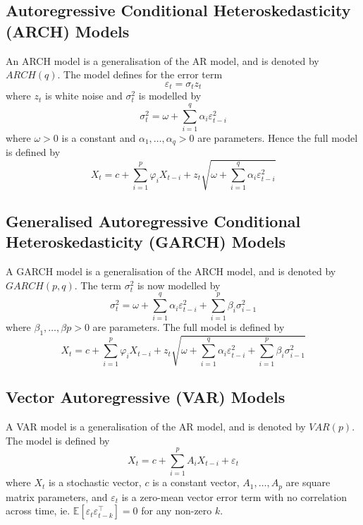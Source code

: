 \documentclass[11pt]{report} %
\begin{document}
\subsection{Autoregressive Conditional Heteroskedasticity (ARCH) Models}
An ARCH model is a generalisation of the AR model, and is denoted by $ARCH\left(q\right)$. The model defines for the error term
\begin{equation}
\varepsilon_{t} = \sigma_{t}z_{t}
\end{equation}
where $z_{t}$ is white noise and $\sigma^{2}_{t}$ is modelled by
\begin{equation}
\sigma^{2}_{t} = \omega + \sum_{i = 1}^{q}\alpha_{i}\varepsilon^{2}_{t - i}
\end{equation}
where $\omega > 0$ is a constant and $\alpha_{1}, \dots, \alpha_{q} > 0$ are parameters. Hence the full model is defined by
\begin{equation}
X_{t} = c + \sum_{i = 1}^{p}\varphi_{i}X_{t - i} + z_{t}\sqrt{\omega + \sum_{i = 1}^{q}\alpha_{i}\varepsilon^{2}_{t - i}}
\end{equation}

\subsection{Generalised Autoregressive Conditional Heteroskedasticity (GARCH) Models}
A GARCH model is a generalisation of the ARCH model, and is denoted by $GARCH\left(p, q\right)$. The term $\sigma^{2}_{t}$ is now modelled by
\begin{equation}
\sigma^{2}_{t} = \omega + \sum_{i = 1}^{q}\alpha_{i}\varepsilon^{2}_{t - i} + \sum_{i = 1}^{p}\beta_{i}\sigma^{2}_{i - 1}
\end{equation}
where $\beta_{1}, \dots, \beta{p} > 0$ are parameters. The full model is defined by
\begin{equation}
X_{t} = c + \sum_{i = 1}^{p}\varphi_{i}X_{t - i} + z_{t}\sqrt{\omega + \sum_{i = 1}^{q}\alpha_{i}\varepsilon^{2}_{t - i} + \sum_{i = 1}^{p}\beta_{i}\sigma^{2}_{i - 1}}
\end{equation}

\subsection{Vector Autoregressive (VAR) Models}
A VAR model is a generalisation of the AR model, and is denoted by  $VAR\left(p\right)$. The model is defined by
\begin{equation}
X_{t} = c + \sum_{i = 1}^{p}A_{i}X_{t - i} + \varepsilon_{t}
\end{equation}
where $X_{t}$ is a stochastic vector, $c$ is a constant vector, $A_{1}, \dots, A_{p}$ are square matrix parameters, and $\varepsilon_{t}$ is a zero-mean vector error term with no correlation across time, ie. $\mathbb{E}\left[\varepsilon_{t}\varepsilon_{t - k}^{\top}\right] = 0$ for any non-zero $k$.
\end{document}
